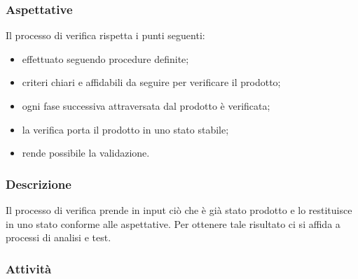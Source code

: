 	\subsubsection{Aspettative}
	Il processo di verifica rispetta i punti seguenti:	
	\begin{itemize}
		\item effettuato seguendo procedure definite;
		\item criteri chiari e affidabili da seguire per verificare il prodotto;
		\item ogni fase successiva attraversata dal prodotto è verificata;
		\item la verifica porta il prodotto in uno stato stabile;
		\item rende possibile la validazione.
	\end{itemize}
	\subsubsection{Descrizione}
	Il processo di verifica prende in input ciò che è già stato prodotto e lo restituisce in uno stato conforme alle aspettative. Per ottenere tale risultato ci si affida a processi di analisi e test.
	\subsubsection{Attività}
